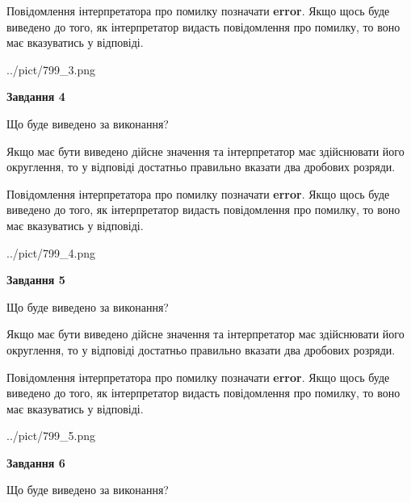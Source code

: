 \documentclass[12pt, ukrainian]{article}
\begin{document}
{\begin {Large}
Повідомлення інтерпретатора про помилку позначати \textbf{error}.
Якщо щось буде виведено до того, як інтерпретатор видасть повідомлення про помилку, 
то воно має вказуватись у відповіді. \par

\begin{center}
	{../pict/799_3.png}
\end{center}
\newpage

{\begin {center}\textbf{Завдання 4}\end {center}}\par
Що буде виведено за виконання? \par

Якщо має бути виведено дійсне значення та інтерпретатор має здійснювати його округлення, 
то у відповіді достатньо правильно вказати два дробових розряди.

Повідомлення інтерпретатора про помилку позначати \textbf{error}.
Якщо щось буде виведено до того, як інтерпретатор видасть повідомлення про помилку, 
то воно має вказуватись у відповіді. \par

\begin{center}
	{../pict/799_4.png}
\end{center}
\newpage

{\begin {center}\textbf{Завдання 5}\end {center}}\par
Що буде виведено за виконання? \par

Якщо має бути виведено дійсне значення та інтерпретатор має здійснювати його округлення, 
то у відповіді достатньо правильно вказати два дробових розряди.

Повідомлення інтерпретатора про помилку позначати \textbf{error}.
Якщо щось буде виведено до того, як інтерпретатор видасть повідомлення про помилку, 
то воно має вказуватись у відповіді. \par

\begin{center}
	{../pict/799_5.png}
\end{center}
\newpage

{\begin {center}\textbf{Завдання 6}\end {center}}\par
Що буде виведено за виконання? \par


\end{Large}}
\end{document}
